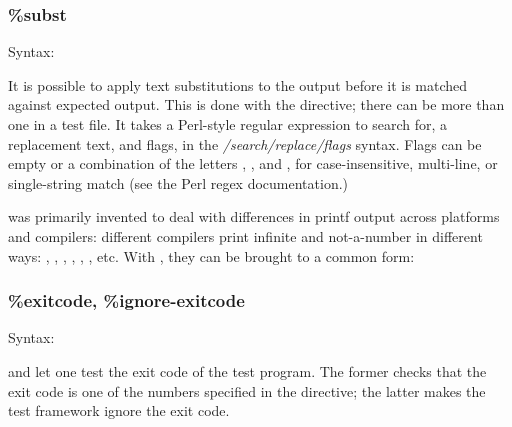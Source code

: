 \subsubsection{\%subst}
\label{sec:testing:opptest:subst}

Syntax:

\begin{filelisting}
\end{filelisting}

It is possible to apply text substitutions to the output before it is
matched against expected output. This is done with the 
directive; there can be more than one  in a test file. It
takes a Perl-style regular expression to search for, a replacement text,
and flags, in the \textit{/search/replace/flags} syntax. Flags can be empty
or a combination of the letters , , and , for
case-insensitive, multi-line, or single-string match (see the Perl regex
documentation.)

 was primarily invented to deal with differences in printf
output across platforms and compilers: different compilers print infinite
and not-a-number in different ways: , , ,
, , , etc. With , they can be
brought to a common form:

\begin{filelisting}
\end{filelisting}

\subsubsection{\%exitcode, \%ignore-exitcode}
\label{sec:testing:opptest:exitcode}

Syntax:
\begin{filelisting}
\end{filelisting}

\begin{filelisting}
\end{filelisting}

 and  let one test the exit code of the
test program. The former checks that the exit code is one of the numbers specified in
the directive; the latter makes the test framework ignore the exit code.


